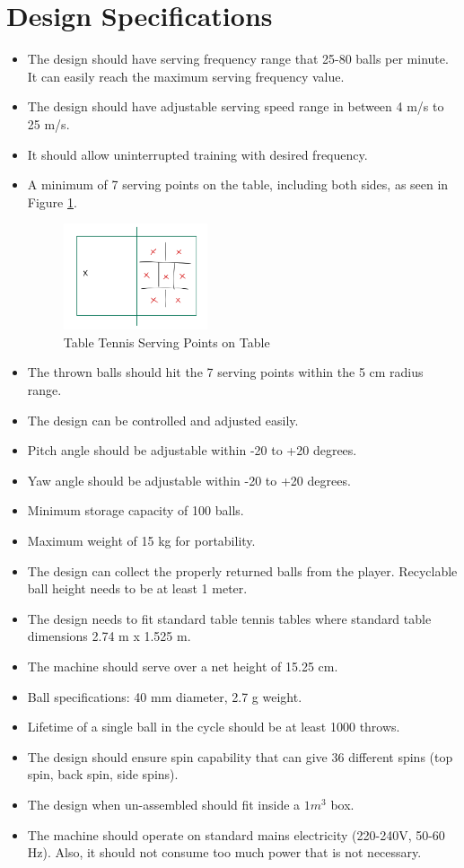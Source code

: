 \documentclass[12pt]{article}
\begin{document}
\section{Design Specifications}
\begin{itemize}
    \item The design should have serving frequency range that 25-80 balls per minute. It can easily reach the maximum serving frequency value.
    \item The design should have adjustable serving speed range in between 4 m/s to 25 m/s.
    \item It should allow uninterrupted training with desired
    frequency.
    \item A minimum of 7 serving points on the table, including both sides, as seen in Figure \ref{fig:7areaoftable}.
    \begin{figure}[H]
        \centering
        \includegraphics[width=0.4\textwidth]{figures/7areaoftable.png}
        \caption{Table Tennis Serving Points on Table}
        \label{fig:7areaoftable}
    \end{figure}
    \item The thrown balls should hit the 7 serving points within the 5 cm radius range.
    \item The design can be controlled and adjusted easily.
    \item Pitch angle should be adjustable within -20 to +20 degrees.
    \item Yaw angle should be adjustable within -20 to +20 degrees.
    \item Minimum storage capacity of 100 balls.
    \item Maximum weight of 15 kg for portability.
    \item The design can collect the properly returned balls from the player. Recyclable ball height needs to be at least 1 meter.
    \item The design needs to fit standard table tennis tables where standard table dimensions 2.74 m x 1.525 m.
    \item The machine should serve over a net height of 15.25 cm.
    \item Ball specifications: 40 mm diameter, 2.7 g weight.
    \item Lifetime of a single ball in the cycle should be at least 1000 throws.
    \item The design should ensure spin capability that can give 36 different spins (top spin, back spin, side spins).
    \item The design when un-assembled should fit inside a $1m^3$ box.
    \item The machine should operate on standard mains electricity (220-240V, 50-60 Hz). Also, it should not consume too much power that is not necessary.
    
\end{itemize}
\end{document}
